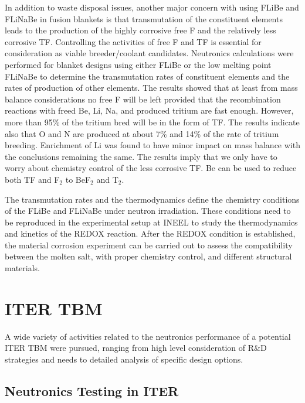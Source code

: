 In addition to waste disposal issues, another major concern with using FLiBe
and FLiNaBe in fusion blankets is that transmutation of the constituent
elements leads to the production of the highly corrosive free F and the
relatively less corrosive TF. Controlling the activities of free F and TF is
essential for consideration as viable breeder/coolant candidates. Neutronics
calculations were performed for blanket designs using either FLiBe or the low
melting point FLiNaBe to determine the transmutation rates of constituent
elements and the rates of production of other elements. The results showed
that at least from mass balance considerations no free F will be left provided
that the recombination reactions with freed Be, Li, Na, and produced tritium
are fast enough. However, more than 95\% of the tritium bred will be in the
form of TF. The results indicate also that O and N are produced at about 7\%
and 14\% of the rate of tritium breeding.  Enrichment of Li was found to have
minor impact on mass balance with the conclusions remaining the same. The
results imply that we only have to worry about chemistry control of the less
corrosive TF. Be can be used to reduce both TF and F$_2$ to BeF$_2$ and T$_2$.

The transmutation rates and the thermodynamics define the chemistry conditions
of the FLiBe and FLiNaBe under neutron irradiation. These conditions need to
be reproduced in the experimental setup at INEEL to study the thermodynamics
and kinetics of the REDOX reaction.  After the REDOX condition is established,
the material corrosion experiment can be carried out to assess the
compatibility between the molten salt, with proper chemistry control, and
different structural materials.

\section{ITER \gls{TBM}}

A wide variety of activities related to the neutronics performance of a
potential ITER \gls{TBM} were pursued, ranging from high level consideration
of R\&D strategies and needs to detailed analysis of specific design options.

\subsection{Neutronics Testing in ITER}

